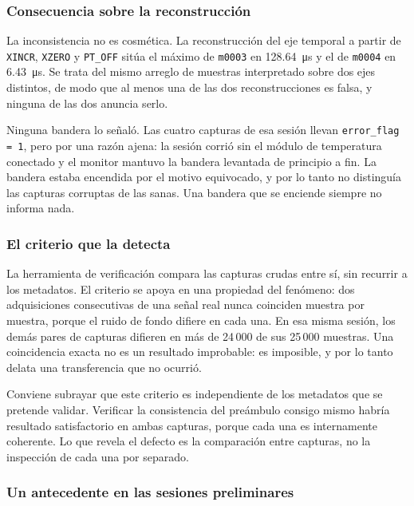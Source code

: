 \subsubsection*{Consecuencia sobre la reconstrucción}

La inconsistencia no es cosmética. La reconstrucción del eje temporal a
partir de \texttt{XINCR}, \texttt{XZERO} y \texttt{PT\_OFF} sitúa el
máximo de \texttt{m0003} en \SI{128.64}{\micro\second} y el de
\texttt{m0004} en \SI{6.43}{\micro\second}. Se trata del mismo arreglo
de muestras interpretado sobre dos ejes distintos, de modo que al menos
una de las dos reconstrucciones es falsa, y ninguna de las dos anuncia
serlo.

Ninguna bandera lo señaló. Las cuatro capturas de esa sesión llevan
\texttt{error\_flag = 1}, pero por una razón ajena: la sesión corrió sin
el módulo de temperatura conectado y el monitor mantuvo la bandera
levantada de principio a fin. La bandera estaba encendida por el motivo
equivocado, y por lo tanto no distinguía las capturas corruptas de las
sanas. Una bandera que se enciende siempre no informa nada.

\subsubsection*{El criterio que la detecta}

La herramienta de verificación compara las capturas crudas entre sí,
sin recurrir a los metadatos. El criterio se apoya en una propiedad del
fenómeno: dos adquisiciones consecutivas de una señal real nunca
coinciden muestra por muestra, porque el ruido de fondo difiere en cada
una. En esa misma sesión, los demás pares de capturas difieren en
más de 24\,000 de sus 25\,000 muestras. Una coincidencia exacta no
es un resultado improbable: es imposible, y por lo tanto delata una
transferencia que no ocurrió.

Conviene subrayar que este criterio es independiente de los metadatos
que se pretende validar. Verificar la consistencia del preámbulo consigo
mismo habría resultado satisfactorio en ambas capturas, porque cada una
es internamente coherente. Lo que revela el defecto es la comparación
entre capturas, no la inspección de cada una por separado.

\subsubsection*{Un antecedente en las sesiones preliminares}

